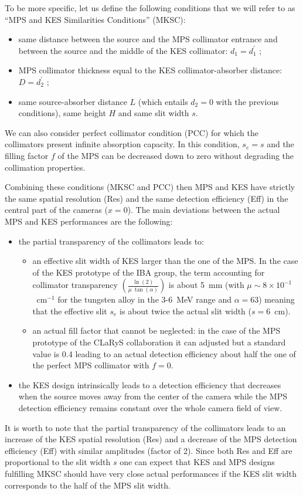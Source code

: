 \documentclass[a4paper,english,12pt]{article}
\begin{document}
To be more specific, let us define the following conditions that we will refer to as \enquote{MPS and KES Similarities Conditions} (MKSC):
\begin{itemize}
	\item same distance between the source and the MPS collimator entrance and between the source and the middle of the KES collimator: $d_1=d_1^{'}$ ;
	\item MPS collimator thickness equal to the KES collimator-absorber distance: $D=d_2^{'}$ ;
	\item same source-absorber distance $L$ (which entails $d_2=0$ with the previous conditions), same height $H$ and same slit width $s$.	
\end{itemize}
We can also consider perfect collimator condition (PCC) for which the collimators present infinite absorption capacity. In this condition, $s_e=s$ and the filling factor $f$ of the MPS can be decreased down to zero without degrading the collimation properties.

Combining these conditions (MKSC and PCC) then MPS and KES have strictly the same spatial resolution (Res) and the same detection efficiency (Eff) in the central part of the cameras ($x=0$). The main deviations between the actual MPS and KES performances are the following: 
\begin{itemize}
	\item the partial transparency of the collimators leads to:
	\begin{itemize}
		\item an effective slit width of KES larger than the one of the MPS. In the case of the KES prototype of the IBA group, the term accounting for collimator transparency $\left(\frac{\ln(2)}{\mu~\tan(\alpha)}\right)$ is about 5~mm (with $\mu\sim 8\times10^{-1}$~cm$^{-1}$ for the tungsten alloy in the 3-6~MeV range and $\alpha=63$\textdegree) meaning that the effective slit $s_e$ is about twice the actual slit width ($s=6$~cm).
		\item an actual fill factor that cannot be neglected: in the case of the MPS prototype of the CLaRyS collaboration it can adjusted but a standard value is 0.4 leading to an actual detection efficiency about half the one of the perfect MPS collimator with $f=0$. 
	\end{itemize}
	\item the KES design intrinsically leads to a detection efficiency that decreases when the source moves away from the center of the camera while the MPS detection efficiency remains constant over the whole camera field of view.
\end{itemize}
It is worth to note that the partial transparency of the collimators leads to an increase of the KES spatial resolution (Res) and a decrease of the MPS detection efficiency (Eff) with similar amplitudes (factor of 2). Since both Res and Eff are proportional to the slit width $s$ one can expect that KES and MPS designs fulfilling MKSC should have very close actual performances if the KES slit width corresponds to the half of the MPS slit width. 
\end{document}
